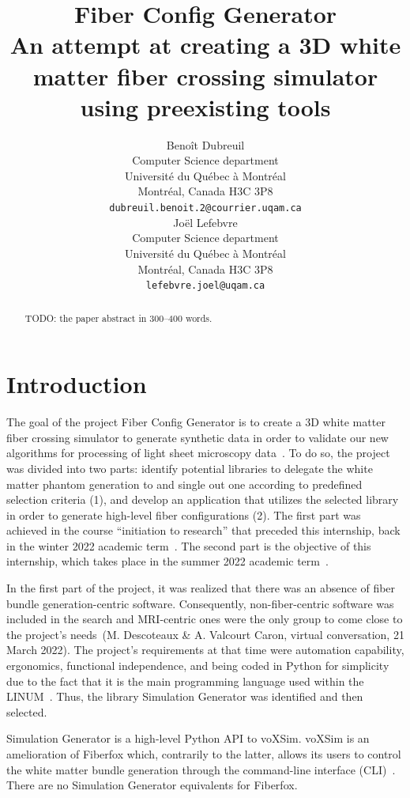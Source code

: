 \documentclass{article}
\title{
  Fiber Config Generator \\
  An attempt at creating a 3D white matter fiber crossing simulator using preexisting tools}
\author{
  Benoît Dubreuil \\
  Computer Science department \\
  Université du Québec à Montréal \\
  Montréal, Canada H3C 3P8 \\
  \texttt{dubreuil.benoit.2@courrier.uqam.ca} \\
  \And
  Joël Lefebvre \\
  Computer Science department\\
  Université du Québec à Montréal \\
  Montréal, Canada H3C 3P8\\
  \texttt{lefebvre.joel@uqam.ca} \\
}
\begin{document}
  \maketitle

  \begin{abstract}
    TODO: the paper abstract in 300--400 words.
  \end{abstract}


  \section{Introduction}\label{sec:introduction}

  The goal of the project Fiber Config Generator is to create a 3D white matter fiber crossing simulator to generate synthetic data in order to validate our new algorithms for processing of light sheet microscopy data~\cite{oliveirasicard2021orientation3d}.
  To do so, the project was divided into two parts: identify potential libraries to delegate the white matter phantom
  generation to and single out one according to predefined selection criteria (1), and develop an application that utilizes the selected library in order to generate high-level fiber configurations (2).
  The first part was achieved in the course ``initiation to research'' that preceded this internship, back in the winter 2022 academic term~\cite{dubreuil2022inf6200}.
  The second part is the objective of this internship, which takes place in the summer 2022 academic term~\cite{dubreuil2022inm5803simgenfork, dubreuil2022inm5803fiberconfiggen}.

  In the first part of the project, it was realized that there was an absence of fiber bundle generation-centric software.
  Consequently, non-fiber-centric software was included in the search and MRI-centric ones were the only group to come close to the project's needs~\nocite{descoteauxvalcourtcaron2022othertoolsthanfiberfox}(M. Descoteaux \& A. Valcourt Caron, virtual conversation, 21 March 2022).
  The project's requirements at that time were automation capability, ergonomics, functional independence, and being coded in Python for simplicity due to the fact that it is the main programming language used within the LINUM~\cite{dubreuil2022inf6200}.
  Thus, the library Simulation Generator was identified and then selected.

  Simulation Generator is a high-level Python API to voXSim.
  voXSim is an amelioration of Fiberfox which, contrarily to the latter, allows its users to control the white matter
  bundle generation through the command-line interface (CLI)~\cite{valcourtcaron2022simulationgenerator, neher2014fiberfox}.
  There are no Simulation Generator equivalents for Fiberfox.
\end{document}

